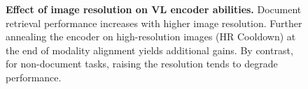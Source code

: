 \begin{figure}[t]
    \centering

    \renewcommand{\arraystretch}{1.1}
    \small
    \caption[Image resolution effect]{\textbf{Effect of image resolution on VL encoder abilities.} Document retrieval performance increases with higher image resolution. Further annealing the encoder on high-resolution images (HR Cooldown) at the end of modality alignment yields additional gains. By contrast, for non-document tasks, raising the resolution tends to degrade performance.}
    \label{table:image_resolution}

\end{figure}

    
